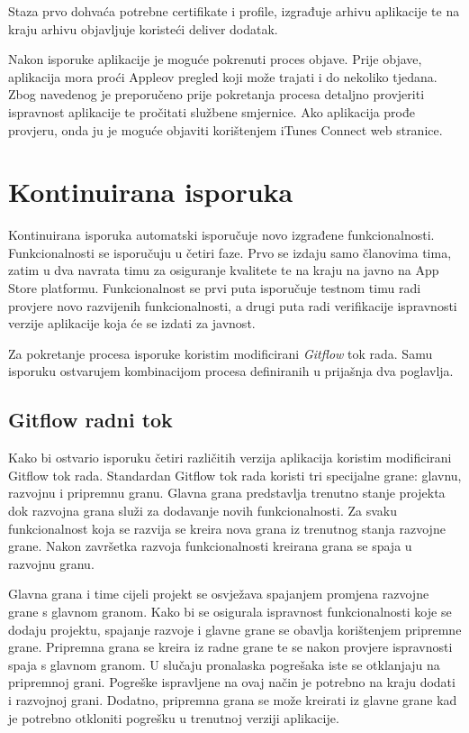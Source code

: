 \documentclass[times, utf8, diplomski, numeric]{fer}
\begin{document}
\begin{appendices}
Staza prvo dohvaća potrebne certifikate i profile, izgrađuje arhivu aplikacije te na kraju arhivu objavljuje koristeći deliver dodatak.

Nakon isporuke aplikacije je moguće pokrenuti proces objave. Prije objave, aplikacija mora proći Appleov pregled koji može trajati i do nekoliko tjedana. Zbog navedenog je preporučeno prije pokretanja procesa detaljno provjeriti ispravnost aplikacije te pročitati službene smjernice. Ako aplikacija prođe provjeru, onda ju je moguće objaviti korištenjem iTunes Connect web stranice.

\section{Kontinuirana isporuka}

Kontinuirana isporuka automatski isporučuje novo izgrađene funkcionalnosti. Funkcionalnosti se isporučuju u četiri faze. Prvo se izdaju samo članovima tima, zatim u dva navrata timu za osiguranje kvalitete te na kraju na javno na App Store platformu. Funkcionalnost se prvi puta isporučuje testnom timu radi provjere novo razvijenih funkcionalnosti, a drugi puta radi verifikacije ispravnosti verzije aplikacije koja će se izdati za javnost.

Za pokretanje procesa isporuke koristim modificirani \textit{Gitflow} tok rada. Samu isporuku ostvarujem kombinacijom procesa definiranih u prijašnja dva poglavlja.

\subsection{Gitflow radni tok}

Kako bi ostvario isporuku četiri različitih verzija aplikacija koristim modificirani Gitflow tok rada. Standardan Gitflow tok rada koristi tri specijalne grane: glavnu, razvojnu i pripremnu granu. Glavna grana predstavlja trenutno stanje projekta dok razvojna grana služi za dodavanje novih funkcionalnosti. Za svaku funkcionalnost koja se razvija se kreira nova grana iz trenutnog stanja razvojne grane. Nakon završetka razvoja funkcionalnosti kreirana grana se spaja u razvojnu granu.

Glavna grana i time cijeli projekt se osvježava spajanjem promjena razvojne grane s glavnom granom. Kako bi se osigurala ispravnost funkcionalnosti koje se dodaju projektu, spajanje razvoje i glavne grane se obavlja korištenjem pripremne grane. Pripremna grana se kreira iz radne grane te se nakon provjere ispravnosti spaja s glavnom granom. U slučaju pronalaska pogrešaka iste se otklanjaju na pripremnoj grani. Pogreške ispravljene na ovaj način je potrebno na kraju dodati i razvojnoj grani. Dodatno, pripremna grana se može kreirati iz glavne grane kad je potrebno otkloniti pogrešku u trenutnoj verziji aplikacije.


\end{appendices}
\end{document}
